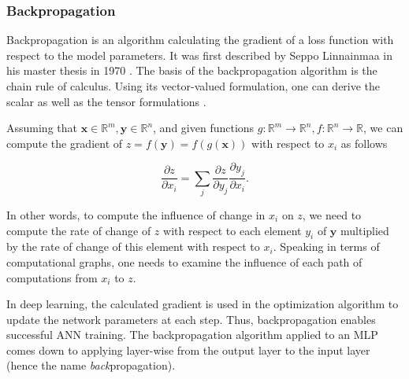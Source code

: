 \subsubsection{Backpropagation}
\label{sec:backpropagation}

Backpropagation is an algorithm calculating the gradient of a loss function with respect to the model parameters. It was first described by Seppo Linnainmaa in his master thesis in 1970 \cite{Linnainmaa1970}. The basis of the backpropagation algorithm is the chain rule of calculus. Using its vector-valued formulation, one can derive the scalar as well as the tensor formulations \cite{Goodfellow-et-al-2016}.

Assuming that $\pmb{x} \in \mathbb{R}^m, \pmb{y} \in \mathbb{R}^n$, and given functions $g: \mathbb{R}^m \rightarrow \mathbb{R}^n, f: \mathbb{R}^n \rightarrow \mathbb{R}$, we can compute the gradient of $z = f(\pmb{y}) = f(g(\pmb{x}))$ with respect to $x_i$ as follows

\begin{equation}
  \frac{\partial z}{\partial x_i} = \sum \limits_j \frac{\partial z}{\partial y_j} \frac{\partial y_j}{\partial x_i}.
  \label{eq:chain_rule_of_calculus}
\end{equation}

In other words, to compute the influence of change in $x_i$ on $z$, we need to compute the rate of change of $z$ with respect to each element $y_i$ of $\pmb{y}$ multiplied by the rate of change of this element with respect to $x_i$. Speaking in terms of computational graphs, one needs to examine the influence of each path of computations from $x_i$ to $z$.

In deep learning, the calculated gradient is used in the optimization algorithm to update the network parameters at each step. Thus, backpropagation enables successful \ac{ANN} training. The backpropagation algorithm applied to an \ac{MLP} comes down to applying  layer-wise from the output layer to the input layer (hence the name \emph{back}propagation).


